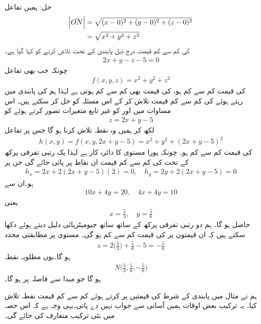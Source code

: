 حل:\quad
ہمیں  تفاعل 
\begin{align*}
\abs{\krightharpoonup{ON}}&=\sqrt{(x-0)^2+(y-0)^2+(z-0)^2}\\
&=\sqrt{x^2+y^2+z^2}
\end{align*}
کی کم سے کم قیمت درج ذیل پابندی کے تحت    تلاش کرنے کو کہا گیا ہے۔
\begin{align*}
2x+y-z-5=0
\end{align*}
چونکہ  جب بھی تفاعل
\begin{align*}
f(x,y,z)=x^2+y^2+z^2
\end{align*}
کی قیمت کم سے کم ہو،  کی قیمت بھی کم سے کم ہوتی ہے لہٰذا  ہم   کی پابندی میں رہتے ہوئے  کی کم سے کم قیمت تلاش کر کے  اس مسئلہ کو  حل کر سکتے ہیں۔   اس مساوات میں  اور  کو غیر تابع متغیرات تصور کرتے ہوئے   کو
\begin{align*}
z=2x+y-5
\end{align*}
لکھ کر ہمیں وہ نقطہ  تلاش کرنا ہو گا جس پر تفاعل
\begin{align*}
h(x,y)=f(x,y,2x+y-5)=x^2+y^2+(2x+y-5)^2
\end{align*}
کی قیمت کم سے کم ہو۔ چونکہ پورا  مستوی  کا دائرہ کار ہے لہٰذا  یک رتبی تفرقی پرکھ کے تحت  کی کم سے کم قیمت ان نقاط پر پائی جائے گی جن پر
\begin{align*}
h_x=2x+2(2x+y-5)(2)=0,\quad h_y=2y+2(2x+y-5)=0
\end{align*}
ہو۔ان سے
\begin{align*}
10x+4y=20,\quad 4x+4y=10
\end{align*}
یعنی
\begin{align*}
x=\frac{5}{3},\quad y=\frac{5}{6}
\end{align*}
حاصل ہو گا۔ ہم دو رتبی تفرقی پرکھ کے ساتھ ساتھ جیومیٹریائی دلیل  دیتے ہوئے  دکھا سکتے ہیں کہ ان قیمتوں پر  کی قیمت کم سے کم ہو گی۔ مستوی  پر مطابقتی  محدد
\begin{align*}
z=2\big(\frac{5}{3}\big)+\frac{5}{6}-5=-\frac{5}{6}
\end{align*}
ہو گا۔یوں  مطلوبہ  نقطہ
\begin{align*}
N\big(\frac{5}{3},\frac{5}{6},-\frac{5}{6}\big)
\end{align*}
ہو گا جو مبدا سے  فاصلہ  پر ہو گا۔

ہم نے  مثال  میں       پابندی کے شرط کی قیمتیں پر کرتے ہوئے کم سے کم قیمت نقطہ تلاش کیا۔ یہ ترکیب بعض اوقات ہمیں آسانی  سے  جواب نہیں دے پاتی۔یہی وجہ ہے کہ اس حصہ میں نئی ترکیب متعارف کی جائے گی۔

